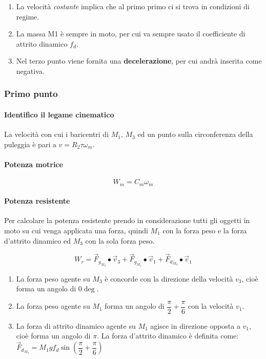 \documentclass[main.tex]{subfiles}
\begin{document}
\begin{enumerate}
\item La velocità \textit{costante} implica che al primo primo ci si trova in condizioni di regime.
\item La massa M1 è sempre in moto, per cui va sempre usato il coefficiente di attrito dinamico $f_d$.
\item Nel terzo punto viene fornita una \textbf{decelerazione}, per cui andrà inserita come negativa.
\end{enumerate}

\subsubsection{Primo punto}

\paragraph{Identifico il legame cinematico} La velocità con cui i baricentri di $M_1$, $M_3$ ed un punto sulla circonferenza della puleggia è pari a $v = R_2\tau\omega_m$.

\paragraph{Potenza motrice}

\[
	W_m = C_m\omega_m
\]

\paragraph{Potenza resistente} Per calcolare la potenza resistente prendo in considerazione tutti gli oggetti in moto su cui venga applicata una forza, quindi $M_1$ con la forza peso e la forza d'attrito dinamico ed $M_3$ con la sola forza peso.

\[
	W_r = \vec{F}_{g_{M_3}}\bullet\vec{v}_3 + \vec{F}_{g_{M_1}}\bullet\vec{v}_1 + \vec{F}_{d_{M_3}}\bullet\vec{v}_1
\]

\begin{enumerate}
\item La forza peso agente su $M_3$ è concorde con la direzione della velocità $v_3$, cioè forma un angolo di $0\deg$.
\item La forza peso agente su $M_1$ forma un angolo di $\dfrac{\pi}{2} + \dfrac{\pi}{6}$ con la velocità $v_1$.
\item La forza di attrito dinamico agente su $M_1$ agisce in direzione opposta a $v_1$, cioè forma un angolo di $\pi$. La forza d'attrito dinamico è definita come: $\vec{F}_{d_{M_3}} = M_1gf_d\sin(\dfrac{\pi}{2}+\dfrac{\pi}{6})$
\end{enumerate}
\end{document}
